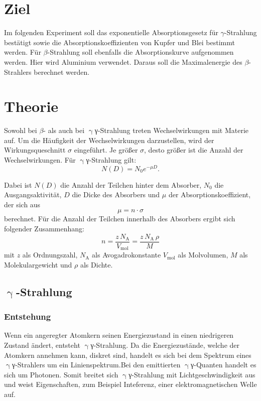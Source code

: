 \section{Ziel}
\label{sec:Ziel}

Im folgenden Experiment soll das exponentielle Absorptionsgesetz für $\gamma$-Strahlung bestätigt sowie die Absorptionskoeffizienten von Kupfer und Blei bestimmt werden. Für $\beta$-Strahlung soll ebenfalls die Absorptionskurve aufgenommen werden. Hier wird Aluminium verwendet. Daraus soll die Maximalenergie des $\beta$-Strahlers berechnet werden.

\section{Theorie}
\label{sec:theorie}
Sowohl bei $\beta$- als auch bei $\upgamma${γ}-Strahlung treten Wechselwirkungen mit Materie auf. Um die Häufigkeit der Wechselwirkungen darzustellen, wird der Wirkungsqueschnitt $\sigma$ eingeführt. Je größer $\sigma$, desto größer ist die Anzahl der Wechselwirkungen. Für $\upgamma${γ}-Strahlung gilt:
\begin{equation}
  N(D)=N_0 e^{-\mu D}.
\end{equation}

Dabei ist $N(D)$ die Anzahl der Teilchen hinter dem Absorber, $N_0$ die Ausgangsaktivität, $D$ die Dicke des Absorbers und $\mu$ der Absorptionskoeffizient, der sich aus
\begin{equation}
  \mu=n \cdot \sigma
\end{equation}
berechnet.
Für die Anzahl der Teilchen innerhalb des Absorbers ergibt sich folgender Zusammenhang:
\begin{equation}
  n=\frac{z\,N_\mathrm{A}}{V_\mathrm{mol}}=\frac{z\,N_\mathrm{A}\,\rho}{M}
\end{equation}
mit $z$ als Ordnungszahl, $N_\mathrm{A}$ als Avogadrokonstante $V_\mathrm{mol}$ als Molvolumen, $M$ als Molekulargewicht und $\rho$ als Dichte.

\subsection{\texorpdfstring{$\upgamma$}{γ}-Strahlung}
\subsubsection{Entstehung}
Wenn ein angeregter Atomkern seinen Energiezustand in einen niedrigeren Zustand ändert, entsteht $\upgamma${γ}-Strahlung. Da die Energiezustände, welche der Atomkern annehmen kann, diskret sind, handelt es sich bei dem Spektrum eines $\upgamma${γ}-Strahlers um ein Linienspektrum.Bei den emittierten $\upgamma${γ}-Quanten handelt es sich um Photonen. Somit breitet sich $\upgamma${γ}-Strahlung mit Lichtgeschwindigkeit aus und weist Eigenschaften, zum Beispiel Inteferenz, einer elektromagnetischen Welle auf.

